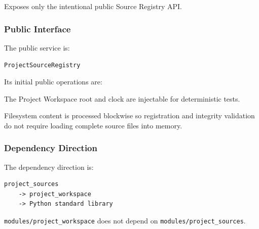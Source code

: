 Exposes only the intentional public Source Registry API.

\hypertarget{public-interface}{%
\subsubsection{Public Interface}\label{public-interface}}

The public service is:

\texttt{ProjectSourceRegistry}

Its initial public operations are:

\begin{Shaded}
\begin{Highlighting}[]
    \OperatorTok{*}\NormalTok{,}
\NormalTok{)}

\NormalTok{)}

\NormalTok{)}

    \OperatorTok{*}\NormalTok{,}
\NormalTok{)}

\NormalTok{)}
\end{Highlighting}
\end{Shaded}

The Project Workspace root and clock are injectable for deterministic tests.

Filesystem content is processed blockwise so registration and integrity validation do not require loading complete source files into memory.

\hypertarget{dependency-direction-1}{%
\subsubsection{Dependency Direction}\label{dependency-direction-1}}

The dependency direction is:

\begin{verbatim}
project_sources
    -> project_workspace
    -> Python standard library
\end{verbatim}

\texttt{modules/project\_workspace} does not depend on \texttt{modules/project\_sources}.

